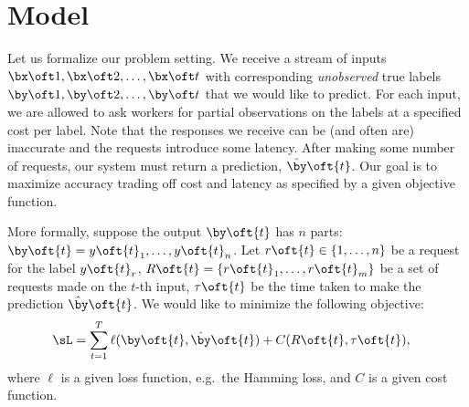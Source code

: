 \section{Model}
\label{sec:model}


Let us formalize our problem setting. %
We receive a stream of inputs $\bx\oft1, \bx\oft2, \ldots, \bx\oft t$ with corresponding {\em unobserved\/} true labels $\by\oft1, \by\oft2, \ldots, \by\oft t$ that we would like to predict.
For each input, we are allowed to ask workers for partial observations on the labels at a specified cost per label.
Note that the responses we receive can be (and often are) inaccurate and the requests introduce some latency.
After making some number of requests, our system must return a prediction, $\byt\oft{t}$.
Our goal is to maximize accuracy trading off cost and latency as specified by a given objective function.

More formally, suppose the output $\by\oft{t}$ has $n$ parts: $\by\oft{t} = y\oft{t}_1, \dots, y\oft{t}_n$.
Let $r\oft{t} \in \{1, \ldots, n\}$ be a request for the label $y\oft{t}_r$,
$R\oft{t} = \{r\oft{t}_1, \dots, r\oft{t}_m\}$ be a set of requests made on the $t$-th input,
$\tau\oft{t}$ be the time taken to make the prediction $\byt\oft{t}$. 
We would like to minimize the following objective:
\begin{align*}
  \sL &= \sum_{t=1}^T \ell(\by\oft{t}, \byt\oft{t}) + C(R\oft{t}, \tau\oft{t}),
\end{align*}
where $\ell$ is a given loss function, e.g.\ the Hamming loss, and $C$ is a given cost function.




